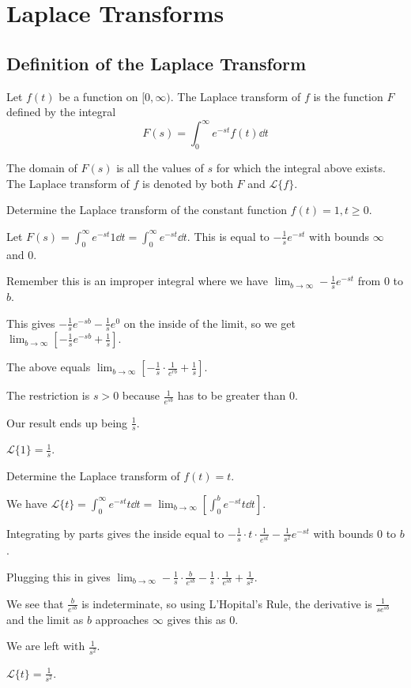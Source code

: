 \documentclass[../diffeq.tex]{subfiles}
\begin{document}
\chapter{Laplace Transforms}
\section{Definition of the Laplace Transform}
\begin{definition}
    Let $f(t)$ be a function on $[0,\infty)$. The Laplace transform of $f$ is the function $F$ defined by the integral 
    \[ F(s)=\int_0^\infty e^{-st}f(t)\dd t \]

    The domain of $F(s)$ is all the values of $s$ for which the integral above exists. The Laplace transform of $f$ is denoted by both $F$ and $\mathcal{L}\{f\}$.
\end{definition}

\begin{example}
    Determine the Laplace transform of the constant function $f(t)=1, t\geq 0$.

    Let $F(s)=\int_0^{\infty}e^{-st}1\dd t = \int_0^{\infty}e^{-st}\dd t$. This is equal to $-\frac{1}{s}e^{-st}$ with bounds $\infty$ and $0$.

    Remember this is an improper integral where we have $\lim_{b\to \infty}-\frac{1}{s}e^{-st}$ from $0$ to $b$.

    This gives $-\frac{1}{s}e^{-sb}-\frac{1}{s}e^0$ on the inside of the limit, so we get $\lim_{b\to \infty}\left[-\frac{1}{s}e^{-sb}+\frac{1}{s}\right]$.

    The above equals $\lim_{b\to\infty}\left[-\frac{1}{s}\cdot\frac{1}{e^{rb}}+\frac{1}{s}\right]$.

    The restriction is $s>0$ because $\frac{1}{e^{sb}}$ has to be greater than 0.

    Our result ends up being $\frac{1}{s}$.

    $\mathcal{L}\{1\}=\frac{1}{s}$.
\end{example}

\begin{example}
    Determine the Laplace transform of $f(t)=t$.

    We have $\mathcal{L}\{t\}=\int_0^{\infty}e^{-st}t\dd t = \lim_{b\to\infty}\left[\int_0^be^{-st}t\dd t\right]$.

    Integrating by parts gives the inside equal to $-\frac{1}{s}\cdot t\cdot \frac{1}{e^{st}}-\frac{1}{s^2}e^{-st}$ with bounds $0$ to $b$.

    Plugging this in gives $\lim_{b\to\infty} -\frac{1}{s}\cdot \frac{b}{e^{sb}}-\frac{1}{s}\cdot\frac{1}{e^{sb}}+\frac{1}{s^2}$.

    We see that $\frac{b}{e^{sb}}$ is indeterminate, so using L'Hopital's Rule, the derivative is $\frac{1}{se^{sb}}$ and the limit as $b$ approaches $\infty$ gives this as $0$.

    We are left with $\frac{1}{s^2}$.

    $\mathcal{L}\{t\}=\frac{1}{s^2}$.
\end{example}
\end{document}
